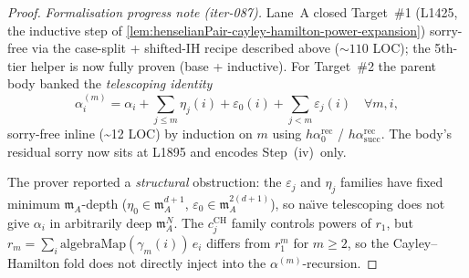 \begin{proof}
\textit{Formalisation progress note (iter-087).} Lane~A closed
Target~\#1 (L1425, the inductive step of
\cref{lem:henselianPair-cayley-hamilton-power-expansion}) sorry-free
via the case-split + shifted-IH recipe described above ($\sim 110$
LOC); the 5th-tier helper is now fully proven (base + inductive).
For Target~\#2 the parent body banked the \emph{telescoping
identity}
\[
\alpha^{(m)}_i = \alpha_i + \sum_{j \le m} \eta_j(i) +
\varepsilon_0(i) + \sum_{j < m} \varepsilon_j(i) \quad \forall m, i,
\]
sorry-free inline (\textasciitilde{}12 LOC) by induction on $m$
using $h\alpha_0^{\mathrm{rec}}$ / $h\alpha_{\mathrm{succ}}^{\mathrm{rec}}$.
The body's residual sorry now sits at L1895 and encodes
Step~(iv)~only.

The prover reported a \emph{structural} obstruction: the
$\varepsilon_j$ and $\eta_j$ families have fixed minimum
$\mathfrak m_A$-depth ($\eta_0 \in \mathfrak m_A^{d+1}$,
$\varepsilon_0 \in \mathfrak m_A^{2(d+1)}$), so na\"\i ve
telescoping does not give $\alpha_i$ in arbitrarily deep
$\mathfrak m_A^{N}$. The $c^{\mathrm{CH}}_j$ family controls
powers of $r_1$, but $r_m = \sum_i \mathrm{algebraMap}(\gamma_m(i))
\,e_i$ differs from $r_1^m$ for $m \ge 2$, so the Cayley--Hamilton
fold does not directly inject into the $\alpha^{(m)}$-recursion.


\end{proof}
